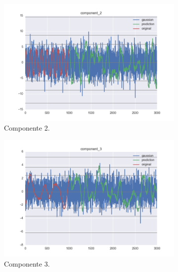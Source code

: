 \documentclass[11pt,spanish,listoffigures,listoftables]{tfgetsinf}
\begin{document}
    \begin{figure}[H]
        \centering
        \begin{subfigure}[h]{0.49\textwidth}
            \centering
            \includegraphics[width=\textwidth]{simulated_data_8_columns/component_2.png}
            \caption{Componente 2.}
            \label{fig:component_2}
        \end{subfigure}
        \begin{subfigure}[h]{0.49\textwidth}
            \centering
            \includegraphics[width=\textwidth]{simulated_data_8_columns/component_3.png}
            \caption{Componente 3.}
            \label{fig:component_3}
        \end{subfigure}
        \begin{subfigure}[h]{0.49\textwidth}
            \centering

\end{subfigure}
\end{figure}
\end{document}
